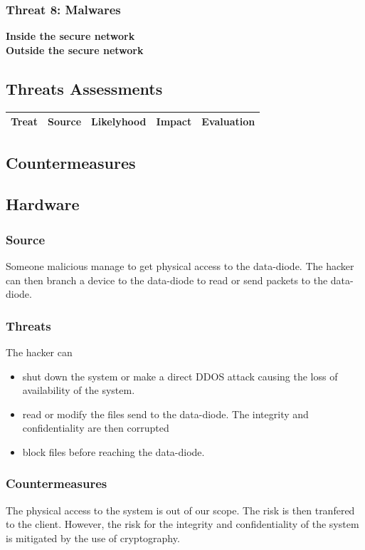 \documentclass[a4paper,11pt]{article}
\begin{document}
\subsubsection{Threat 8: Malwares}
\textbf{Inside the secure network}\\
\textbf{Outside the secure network}\\

\subsection{Threats Assessments}
\begin{tabular}{|c|c|c|c|c|}
\hline
Treat & Source & Likelyhood & Impact & Evaluation \\
\hline

\end{tabular}
\subsection{Countermeasures}




\subsection{Hardware}
\subsubsection{Source}
Someone malicious manage to get physical access to the data-diode. The hacker can then branch a device to the data-diode to read or send packets to the data-diode.
\subsubsection{Threats}
The hacker can
\begin{itemize}
\item shut down the system or make a direct DDOS attack causing the loss of availability of the system.
\item read or modify the files send to the data-diode. The integrity and confidentiality are then corrupted
\item block files before reaching the data-diode.
\end{itemize}
\subsubsection{Countermeasures}
The physical access to the system is out of our scope. The risk is then tranfered to the client. However, the risk for the integrity and confidentiality of the system is mitigated by the use of cryptography.
\end{document}
